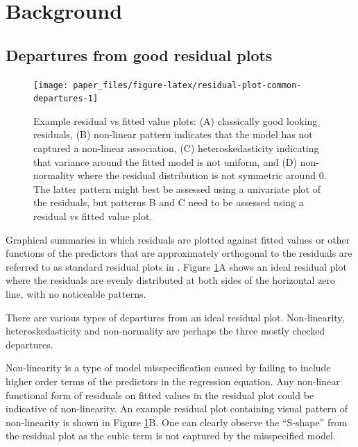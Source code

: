 \documentclass[]{interact}
\theoremstyle{plain}%
\theoremstyle{definition}
\theoremstyle{remark}
\begin{document}
\hypertarget{background}{%
\section{Background}\label{background}}

\hypertarget{departures-from-good-residual-plots}{%
\subsection{Departures from good residual
plots}\label{departures-from-good-residual-plots}}

\begin{figure}

{\centering \texttt{[image: paper\_files/figure-latex/residual-plot-common-departures-1]} 

}

\caption{Example residual vs fitted value plots: (A) classically good looking residuals, (B) non-linear pattern indicates that the model has not captured a non-linear association, (C) heteroskedasticity indicating that variance around the fitted model is not uniform, and (D) non-normality where the residual distribution is not symmetric around 0. The latter pattern might best be assessed using a univariate plot of the residuals, but patterns B and C need to be assessed using a residual vs fitted value plot.}\label{fig:residual-plot-common-departures}
\end{figure}

Graphical summaries in which residuals are plotted against fitted values
or other functions of the predictors that are approximately orthogonal
to the residuals are referred to as standard residual plots in
\citet{cook1982residuals}. Figure
\ref{fig:residual-plot-common-departures}A shows an ideal residual plot
where the residuals are evenly distributed at both sides of the
horizontal zero line, with no noticeable patterns.

There are various types of departures from an ideal residual plot.
Non-linearity, heteroskedasticity and non-normality are perhaps the
three mostly checked departures.

Non-linearity is a type of model misspecification caused by failing to
include higher order terms of the predictors in the regression equation.
Any non-linear functional form of residuals on fitted values in the
residual plot could be indicative of non-linearity. An example residual
plot containing visual pattern of non-linearity is shown in Figure
\ref{fig:residual-plot-common-departures}B. One can clearly observe the
``S-shape'' from the residual plot as the cubic term is not captured by
the misspecified model.
\end{document}
